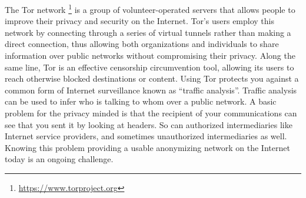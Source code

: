 The Tor network \footnote{\url{https://www.torproject.org}} is a group of 
volunteer-operated servers that allows people to 
improve their privacy and security on the Internet. Tor's users employ this 
network by connecting through a series of virtual tunnels rather than making a 
direct connection, thus allowing both organizations and individuals to share 
information over public networks without compromising their privacy. Along the 
same line, Tor is an effective censorship circumvention tool, allowing its users 
to reach otherwise blocked destinations or content.
Using Tor protects you against a common form of Internet surveillance known as 
``traffic analysis''. Traffic analysis can be used to infer who is talking to 
whom over a public network.
A basic problem for the privacy minded is that the recipient of your 
communications can see that you sent it by looking at headers. So can authorized 
intermediaries like Internet service providers, and sometimes unauthorized 
intermediaries as well.
Knowing this problem providing a usable anonymizing network on the Internet 
today is an ongoing challenge. 


